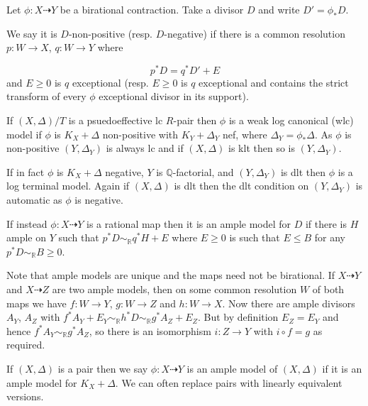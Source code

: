 \begin{definition}\label{Model-defs}
	Let $\phi:X \dashrightarrow Y$ be a birational contraction. Take a divisor $D$ and write $D'=\phi_{*}D$. 
	
	We say it is $D$-non-positive (resp. $D$-negative) if there is a common resolution $p:W \to X$, $q:W \to Y$ where 
	
	\[p^{*}D=q^{*}D'+E\]
	and $E \geq 0$ is $q$ exceptional (resp. $E \geq 0$ is $q$ exceptional and contains the strict transform of every $\phi$ exceptional divisor in its support). 
	
	If $(X,\Delta)/T$ is a psuedoeffective lc $R$-pair then $\phi$ is a weak log canonical (wlc) model if $\phi$ is $K_{X}+\Delta$ non-positive with $K_{Y}+\Delta_{Y}$ nef, where $\Delta_{Y}=\phi_{*}\Delta$. As $\phi$ is non-positive $(Y,\Delta_{Y})$ is always lc and if $(X,\Delta)$ is klt then so is $(Y,\Delta_{Y})$. 
	
	If in fact $\phi$ is $K_{X}+\Delta$ negative, $Y$ is $\mathbb{Q}$-factorial, and $(Y,\Delta_{Y})$ is dlt then $\phi$ is a log terminal model. Again if $(X,\Delta)$ is dlt then the dlt condition on $(Y,\Delta_{Y})$ is automatic as $\phi$ is negative.
	
	If instead $\phi:X \dashrightarrow Y$ is a rational map then it is an ample model for $D$ if there is $H$ ample on $Y$ such that $p^{*}D\sim_{\mathbb{R}}q^{*}H+E$ where $E \geq 0$ is such that $E \leq B$ for any $p^{*}D \sim_{\mathbb{R}} B \geq 0$.
\end{definition}


Note that ample models are unique and the maps need not be birational. If $X \dashrightarrow Y$ and $X \dashrightarrow Z$ are two ample models, then on some common resolution $W$ of both maps we have $f:W \to Y$, $g:W \to Z$ and $h:W \to X$. Now there are ample divisors $A_{Y}$, $A_{Z}$ with $f^{*}A_{Y}+E_{Y}\sim_{\mathbb{R}}h^{*}D \sim_{\mathbb{R}}g^{*}A_{Z}+E_{Z}$. But by definition $E_{Z}=E_{Y}$ and hence $f^{*}A_{Y}\sim_{\mathbb{R}}g^{*}A_{Z}$, so there is an isomorphism $i:Z \to Y$ with $i \circ f= g$ as required.

If $(X,\Delta)$ is a pair then we say $\phi:X \dashrightarrow Y$ is an ample model of $(X,\Delta)$ if it is an ample model for $K_{X}+\Delta$. We can often replace pairs with linearly equivalent versions.

